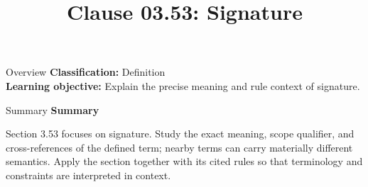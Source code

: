 \documentclass[10pt,letterpaper]{article}
\title{Clause 03.53: Signature}
\author{}
\date{}
\begin{document}
\maketitle
\begin{CornellOverviewBox}{Overview}
\textbf{Classification:} Definition\\[2pt]
\textbf{Learning objective:} Explain the precise meaning and rule context of signature.
\end{CornellOverviewBox}\begin{CornellSummaryBox}{Summary}
{\sffamily\bfseries\color{Accent} Summary}\par\vspace{3pt}Section 3.53 focuses on signature. Study the exact meaning, scope qualifier, and cross-references of the defined term; nearby terms can carry materially different semantics. Apply the section together with its cited rules so that terminology and constraints are interpreted in context.
\end{CornellSummaryBox}
\end{document}
